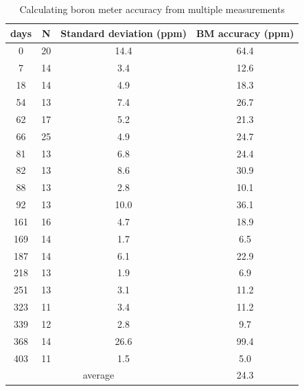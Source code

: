 \documentclass{article}
\begin{document}
\begin{table}[ht]
\centering
\caption{Calculating boron meter accuracy from multiple measurements}
\label{table:boron_uncertainty_multiple}
\begin{tabular}{|c|c|c|c|}
\hline
days & N  & Standard deviation (ppm) & BM accuracy (ppm) \\ \hline
0    & 20 & 14.4                     & 64.4              \\ \hline
7    & 14 & 3.4                      & 12.6              \\ \hline
18   & 14 & 4.9                      & 18.3              \\ \hline
54   & 13 & 7.4                      & 26.7              \\ \hline
62   & 17 & 5.2                      & 21.3              \\ \hline
66   & 25 & 4.9                      & 24.7              \\ \hline
81   & 13 & 6.8                      & 24.4              \\ \hline
82   & 13 & 8.6                      & 30.9              \\ \hline
88   & 13 & 2.8                      & 10.1              \\ \hline
92   & 13 & 10.0                     & 36.1              \\ \hline
161  & 16 & 4.7                      & 18.9              \\ \hline
169  & 14 & 1.7                      & 6.5               \\ \hline
187  & 14 & 6.1                      & 22.9              \\ \hline
218  & 13 & 1.9                      & 6.9               \\ \hline
251  & 13 & 3.1                      & 11.2              \\ \hline
323  & 11 & 3.4                      & 11.2              \\ \hline
339  & 12 & 2.8                      & 9.7               \\ \hline
368  & 14 & 26.6                     & 99.4              \\ \hline
403  & 11 & 1.5                      & 5.0               \\ \hline
\multicolumn{3}{|c|}{average}        & 24.3              \\ \hline
\end{tabular}
\end{table}
\end{document}
